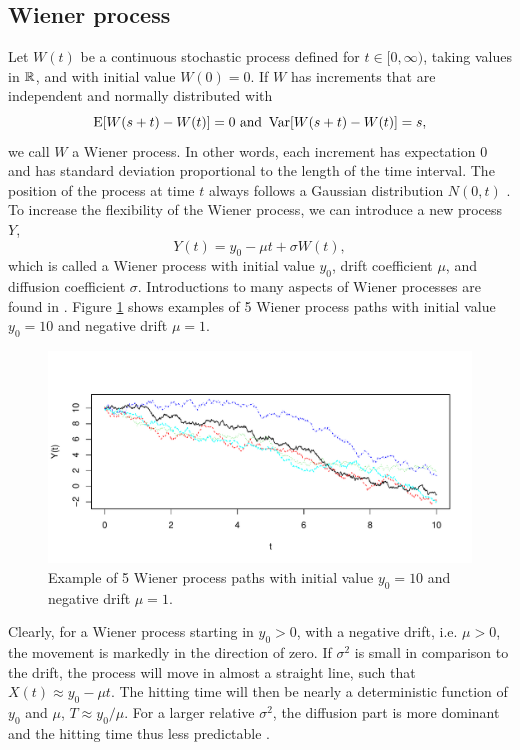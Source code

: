 \subsection{Wiener process}
Let $W(t)$ be a continuous stochastic process defined for $t\in[0,\infty)$, taking values in $\mathbb{R}$, and with initial value $W(0)=0$. If $W$ has increments that are independent and normally distributed with
\begin{equation*}
    \operatorname{E}[W(s+t)-W(t)]=0\text{   and   }\operatorname{Var}[W(s+t)-W(t)]=s,
\end{equation*}
we call $W$ a Wiener process. In other words, each increment has expectation 0 and has standard deviation proportional to the length of the time interval. The position of the process at time $t$ always follows a Gaussian distribution $N(0, t)$ \citep{ABG}. To increase the flexibility of the Wiener process, we can introduce a new process $Y$,
\begin{equation}\label{wiener}
    Y(t)=y_0-\mu t+\sigma W(t),
\end{equation}
which is called a Wiener process with initial value $y_0$, drift coefficient $\mu$, and diffusion coefficient $\sigma$. Introductions to many aspects of Wiener processes are found in \citet{cox1965}. Figure \ref{plot:wiener} shows examples of 5 Wiener process paths with initial value $y_0=10$ and negative drift $\mu=1$.
\begin{figure}[H]
\label{plot:wiener}
\caption{Example of 5 Wiener process paths with initial value $y_0=10$ and negative drift $\mu=1$.}
\centering
\includegraphics[scale=0.4]{figures/wiener_processes.pdf}
\end{figure}
\noindent{}Clearly, for a Wiener process starting in $y_0>0$, with a negative drift, i.e. $\mu>0$, the movement is markedly in the direction of zero. If $\sigma^2$ is small in comparison to the drift, the process will move in almost a straight line, such that $X(t)\approx y_0-\mu t$. The hitting time will then be nearly a deterministic function of $y_0$ and $\mu$, $T\approx y_0/\mu$. For a larger relative $\sigma^2$, the diffusion part is more dominant and the hitting time thus less predictable \citep{ABG}.

